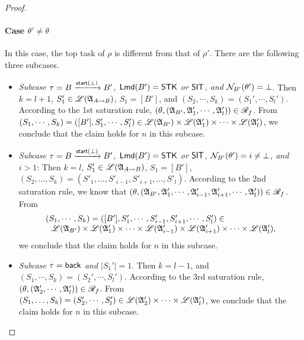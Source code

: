 \begin{proof}
{\paragraph{Case $\theta' \neq \theta$}
In this case, the top task of $\rho$ is different from that of $\rho'$.  There are the following three subcases. 
\begin{itemize}
    \item \emph{Subcase $\tau = B \xrightarrow{{\mathsf{start} }(\bot)} B'$, ${\sf Lmd}(B') = \mathsf{STK}$ or $\mathsf{SIT}$, and $\mathcal{N}_{B'}(\theta') = \bot$}. Then $k=l+1$, $S_1' \in {\mathscr{L} }({\mathfrak{A} }_{A\rightsquigarrow B})$, $S_1=[B']$, and $(S_2,\cdots,S_k)=(S_1',\cdots,S_l')$.  According to the 1st saturation rule, $(\theta, ({\mathfrak{A} }_{B'}, {\mathfrak{A} }_1', \cdots, {\mathfrak{A} }_l')) \in \mathscr{R}_f$.
   From $(S_1, \cdots, S_k) = ([B'], S_1', \cdots, S_l') \in {\mathscr{L} }({\mathfrak{A} }_{B'}) \times {\mathscr{L} }({\mathfrak{A} }_1') \times \cdots \times {\mathscr{L} }({\mathfrak{A} }_l')$, we conclude that the claim holds for $n$ in this subcase.
    \item \emph{Subcase $\tau = B \xrightarrow{{\mathsf{start} }(\bot)} B'$, ${\sf Lmd}(B')=\mathsf{STK}$ or $\mathsf{SIT}$, $\mathcal{N}_{B'}(\theta') = i \neq \bot$, and $i > 1$}: Then $k = l$, 
    $S'_1  \in {\mathscr{L} }({\mathfrak{A} }_{A\rightsquigarrow B})$, $S_1 = [B']$, $(S_2, \dots, S_k) = (S'_1, \dots, S'_{i-1}, S'_{i+1}, \dots, S'_l)$. According to the 2nd saturation rule, we know that $(\theta, ({\mathfrak{A} }_{B'}, {\mathfrak{A} }_1',\cdots, {\mathfrak{A} }_{i-1}', {\mathfrak{A} }_{i+1}', \cdots, {\mathfrak{A} }_{l}')) \in \mathscr{R}_f$. 
    From 
    $$
    \begin{array}{l}
    	(S_1,\cdots,S_k) = ([B'], S_1', \cdots, S_{i-1}', S_{i+1}', \cdots, S_l') \in \\
    	\ \ {\mathscr{L} }({\mathfrak{A} }_{B'}) \times {\mathscr{L} }({\mathfrak{A} }_1') \times \cdots \times {\mathscr{L} }({\mathfrak{A} }_{i-1}') \times {\mathscr{L} }({\mathfrak{A} }_{i+1}')\times \cdots \times {\mathscr{L} }({\mathfrak{A} }_{l}'),
    \end{array}
    $$  
    we conclude that the claim holds for $n$ in this subcase. 
%
    \item \emph{Subcase $\tau = {\mathsf{back} }$ and $|S_1'|=1$}. Then $k = l - 1$, and $(S_1,\cdots,S_k) = (S_2',\cdots,S_l')$.  According to the 3rd saturation rule, $(\theta, ({\mathfrak{A} }_2',\cdots,{\mathfrak{A} }_l')) \in \mathscr{R}_f$. From $(S_1,\dots,S_k) = (S'_2, \cdots, S'_l) \in {\mathscr{L} }({\mathfrak{A} }_2') \times \cdots \times {\mathscr{L} }({\mathfrak{A} }_l')$, we conclude that the claim holds for $n$ in this subcase. 
\end{itemize}
}
\end{proof}


